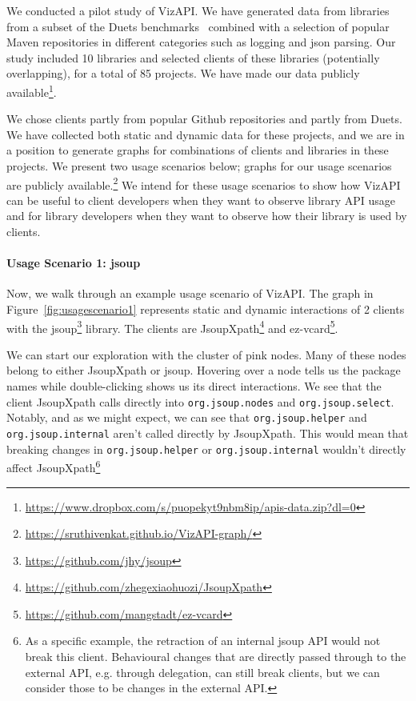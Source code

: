 We conducted a pilot study of VizAPI.
We have generated data from libraries from a subset of the
Duets benchmarks~\cite{durieux21} combined with a selection of
popular Maven repositories 
in different categories such as logging and json parsing.
Our study included 10 libraries and
selected clients of these libraries (potentially overlapping), for a total of 85 projects.
We have made our data publicly available\footnote{\url{https://www.dropbox.com/s/puopekyt9nbm8ip/apis-data.zip?dl=0}}.

We chose clients partly
from popular Github repositories and partly from Duets.
We have collected both static and dynamic data for these projects, 
and we are in a position
to generate graphs for combinations of clients and libraries
in these projects. 
We present two usage scenarios below; graphs for 
our usage scenarios are publicly available.\footnote{\url{https://sruthivenkat.github.io/VizAPI-graph/}}
We intend for these usage scenarios to show how VizAPI can be useful to client developers when they want to observe library API usage and for library developers when they want to observe how their library is used by clients.

\paragraph{Usage Scenario 1: jsoup}
Now, we walk through an example usage scenario of VizAPI.
The graph in Figure~\ref{fig:usagescenario1} represents static and dynamic interactions of 2 clients with the jsoup\footnote{\url{https://github.com/jhy/jsoup}\label{jsoup}} library. The clients are JsoupXpath\footnote{\url{https://github.com/zhegexiaohuozi/JsoupXpath}\label{jsoupxpath}} and ez-vcard\footnote{\url{https://github.com/mangstadt/ez-vcard}\label{ez-vcard}}.

We can start our exploration with the cluster of pink nodes. Many of these nodes belong to either JsoupXpath or jsoup. Hovering over a node tells us the package names while double-clicking shows us its direct interactions. We see that the client JsoupXpath calls directly into \texttt{org.jsoup.nodes} and \texttt{org.jsoup.select}. Notably, and as we might expect, we can see that \texttt{org.jsoup.helper} and \texttt{org.jsoup.internal} aren't called directly by JsoupXpath. This would mean that breaking changes in \texttt{org.jsoup.helper} or \texttt{org.jsoup.internal} wouldn't directly affect JsoupXpath\footnote{As a specific example, the retraction of an internal jsoup API would not break this client. Behavioural changes that are directly passed through to the external API, e.g. through delegation, can still break clients, but we can consider those to be changes in the external API.} 


